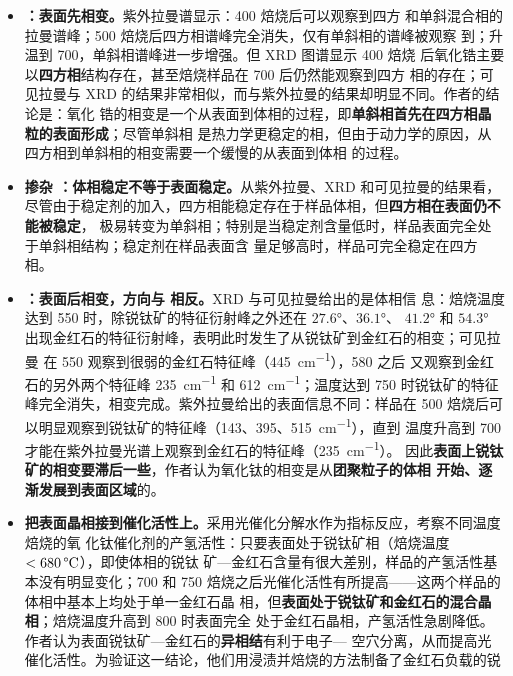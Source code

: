 \begin{itemize}
\item \textbf{：表面先相变。}紫外拉曼谱显示：\qty{400}{\degC} 焙烧后可以观察到四方
  和单斜混合相的拉曼谱峰；\qty{500}{\degC} 焙烧后四方相谱峰完全消失，仅有单斜相的谱峰被观察
  到；升温到 \qty{700}{\degC}，单斜相谱峰进一步增强。但 XRD 图谱显示 \qty{400}{\degC} 焙烧
  后氧化锆主要以\textbf{四方相}结构存在，甚至焙烧样品在 \qty{700}{\degC} 后仍然能观察到四方
  相的存在；可见拉曼与 XRD 的结果非常相似，而与紫外拉曼的结果却明显不同。作者的结论是：氧化
  锆的相变是一个从表面到体相的过程，即\textbf{单斜相首先在四方相晶粒的表面形成}；尽管单斜相
  是热力学更稳定的相，但由于动力学的原因，从四方相到单斜相的相变需要一个缓慢的从表面到体相
  的过程。
\item \textbf{掺杂 ：体相稳定不等于表面稳定。}从紫外拉曼、XRD 和可见拉曼的结果看，
  尽管由于稳定剂的加入，四方相能稳定存在于样品体相，但\textbf{四方相在表面仍不能被稳定}，
  极易转变为单斜相；特别是当稳定剂含量低时，样品表面完全处于单斜相结构；稳定剂在样品表面含
  量足够高时，样品可完全稳定在四方相。
\item \textbf{：表面后相变，方向与  相反。}XRD 与可见拉曼给出的是体相信
  息：焙烧温度达到 \qty{550}{\degC} 时，除锐钛矿的特征衍射峰之外还在 $27.6$°、$36.1$°、
  $41.2$° 和 $54.3$° 出现金红石的特征衍射峰，表明此时发生了从锐钛矿到金红石的相变；可见拉曼
  在 \qty{550}{\degC} 观察到很弱的金红石特征峰（\qty{445}{cm^{-1}}），\qty{580}{\degC} 之后
  又观察到金红石的另外两个特征峰 \qty{235}{cm^{-1}} 和 \qty{612}{cm^{-1}}；温度达到
  \qty{750}{\degC} 时锐钛矿的特征峰完全消失，相变完成。紫外拉曼给出的表面信息不同：样品在
  \qty{500}{\degC} 焙烧后可以明显观察到锐钛矿的特征峰（143、395、\qty{515}{cm^{-1}}），直到
  温度升高到 \qty{700}{\degC} 才能在紫外拉曼光谱上观察到金红石的特征峰（\qty{235}{cm^{-1}}）。
  因此\textbf{表面上锐钛矿的相变要滞后一些}，作者认为氧化钛的相变是从\textbf{团聚粒子的体相
  开始、逐渐发展到表面区域}的。
\item \textbf{把表面晶相接到催化活性上。}采用光催化分解水作为指标反应，考察不同温度焙烧的氧
  化钛催化剂的产氢活性：只要表面处于锐钛矿相（焙烧温度 $<\qty{680}{\degC}$），即使体相的锐钛
  矿—金红石含量有很大差别，样品的产氢活性基本没有明显变化；\qty{700}{\degC} 和
  \qty{750}{\degC} 焙烧之后光催化活性有所提高——这两个样品的体相中基本上均处于单一金红石晶
  相，但\textbf{表面处于锐钛矿和金红石的混合晶相}；焙烧温度升高到 \qty{800}{\degC} 时表面完全
  处于金红石晶相，产氢活性急剧降低。作者认为表面锐钛矿—金红石的\textbf{异相结}有利于电子—
  空穴分离，从而提高光催化活性。为验证这一结论，他们用浸渍并焙烧的方法制备了金红石负载的锐

\end{itemize}
